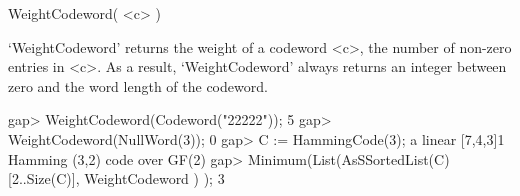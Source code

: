 \>WeightCodeword( <c> )

`WeightCodeword'  returns the weight  of  a codeword <c>,  the number  of
non-zero entries in <c>. As a result,  `WeightCodeword' always returns an
integer between zero and the word length of the codeword.

\beginexample
gap> WeightCodeword(Codeword("22222"));
5
gap> WeightCodeword(NullWord(3));
0
gap> C := HammingCode(3);
a linear [7,4,3]1 Hamming (3,2) code over GF(2)
gap> Minimum(List(AsSSortedList(C){[2..Size(C)]}, WeightCodeword ) );
3 
\endexample

